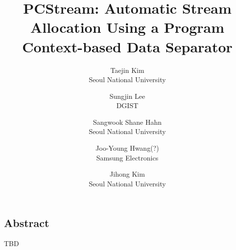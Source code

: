 \documentclass[letterpaper, twocolumn, 10pt]{article}
\begin{document}
\title{
\bf PCStream: Automatic Stream Allocation Using a Program Context-based Data Separator
}


\author{
{\rm Taejin Kim}\\
Seoul National University
\and 
{\rm Sungjin Lee}\\
DGIST
\and 
{\rm Sangwook Shane Hahn}\\
Seoul National University
\and 
{\rm Joo-Young Hwang(?)} \\
Samsung Electronics
\and 
{\rm Jihong Kim} \\
Seoul National University
}

\maketitle

\thispagestyle{empty}

\subsection*{Abstract}
TBD








\end{document}
